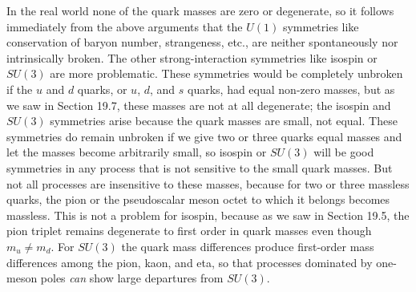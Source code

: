 In the real world none of the quark masses are zero or degenerate, so it follows immediately from the above arguments that the $U(1)$ symmetries like conservation of baryon number, strangeness, etc., are neither spontaneously nor intrinsically broken. The other strong-interaction symmetries like isospin or $SU(3)$ are more problematic. These symmetries would be completely unbroken if the $u$ and $d$ quarks, or $u$, $d$, and $s$ quarks, had equal non-zero masses, but as we saw in Section 19.7, these masses are not at all degenerate; the isospin and $SU(3)$ symmetries arise because the quark masses are small, not equal. These symmetries do remain unbroken if we give two or three quarks equal masses and let the masses become arbitrarily small, so isospin or $SU(3)$ will be good symmetries in any process that is not sensitive to the small quark masses. But not all processes are insensitive to these masses, because for two or three massless quarks, the pion or the pseudoscalar meson octet to which it belongs becomes massless. This is not a problem for isospin, because as we saw in Section 19.5, the pion triplet remains degenerate to first order in quark masses even though $m_u\ne m_d$. For $SU(3)$ the quark mass differences produce first-order mass differences among the pion, kaon, and eta, so that processes dominated by one-meson poles \emph{can} show large departures from $SU(3)$.
